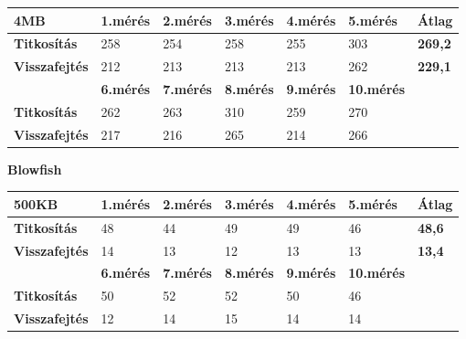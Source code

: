 \begin{center}
	
	
	\begin{tabular}{|p{2.4cm}|p{1.7cm}|p{1.7cm}|p{1.7cm}|p{1.7cm}|p{1.8cm}|p{1.2cm}|}
		\hline
		\textbf{4MB} & \textbf{1.mérés} & \textbf{2.mérés} & \textbf{3.mérés} & \textbf{4.mérés} & \textbf{5.mérés} & \textbf{Átlag} \\
		\hline
		\textbf{Titkosítás}&258&254&258&255&303&\textbf{269,2}\\
		\hline
		\textbf{Visszafejtés}&212&213&213&213&262&\textbf{229,1}\\
		\hline
		& \textbf{6.mérés} & \textbf{7.mérés} & \textbf{8.mérés} & \textbf{9.mérés} & \textbf{10.mérés} & \\
		\hline
		\textbf{Titkosítás}&262&263&310&259&270&\\
		\hline
		\textbf{Visszafejtés}&217&216&265&214&266& \\
		\hline
	\end{tabular}
\end{center}


\newpage \noindent \textbf{Blowfish}

\begin{center}
	
	
	\begin{tabular}{|p{2.4cm}|p{1.7cm}|p{1.7cm}|p{1.7cm}|p{1.7cm}|p{1.8cm}|p{1.2cm}|}
		\hline
		\textbf{500KB} & \textbf{1.mérés} & \textbf{2.mérés} & \textbf{3.mérés} & \textbf{4.mérés} & \textbf{5.mérés} & \textbf{Átlag} \\
		\hline
		\textbf{Titkosítás}&48&44&49&49&46&\textbf{48,6} \\
		\hline
		\textbf{Visszafejtés}&14&13&12&13&13&\textbf{13,4} \\
		\hline
		& \textbf{6.mérés} & \textbf{7.mérés} & \textbf{8.mérés} & \textbf{9.mérés} & \textbf{10.mérés} & \\
		\hline
		\textbf{Titkosítás}&50&52&52&50&46&\\
		\hline
		\textbf{Visszafejtés}&12&14&15&14&14&\\
		\hline
	\end{tabular}
\end{center}


